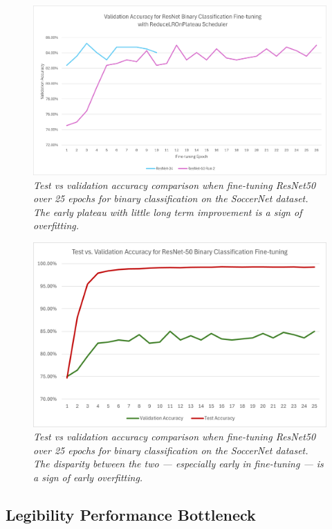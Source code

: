 \documentclass[11pt, letterpaper]{article}
\begin{document}
\begin{figure}
  \centering
  \includegraphics[width=0.8\linewidth]{../results/Resnet_Validation_Accuracy_Comparison_ReduceLROnPlateau.png}
  \caption{\label{fig:Resnet_Validation_Accuracy_Comparison}\textit{Test vs validation accuracy comparison when fine-tuning ResNet50 over 25 epochs for binary classification on the SoccerNet dataset. The early plateau with little long term improvement is a sign of overfitting.}}
\end{figure}

\begin{figure}
  \centering
  \includegraphics[width=0.8\linewidth]{../results/Resnet_Validation_vs_Test_Accuracy_Comparison.png}
  \caption{\label{fig:Resnet_Validation_vs_Test_Accuracy}\textit{Test vs validation accuracy comparison when fine-tuning ResNet50 over 25 epochs for binary classification on the SoccerNet dataset. The disparity between the two — especially early in fine-tuning — is a sign of early overfitting.}}
\end{figure}

\subsection{Legibility Performance Bottleneck}
\end{document}

